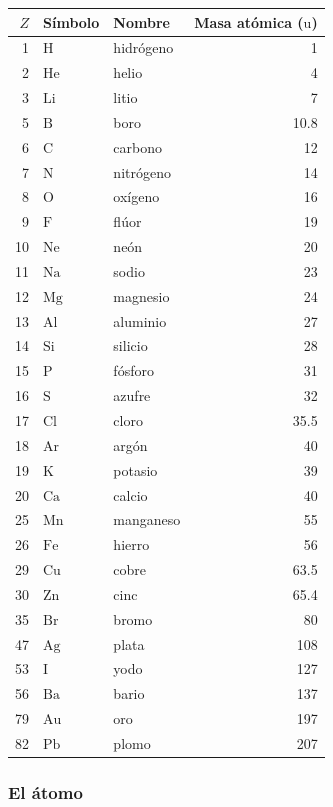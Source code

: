 \begin{center}
\begin{tabular}{rllr}
\hline
$Z$ & Símbolo & Nombre & Masa atómica ($\mathrm{u}$) \\
\hline
1  & $\mathrm{H}$  & hidrógeno & 1 \\
2  & $\mathrm{He}$ & helio & 4 \\
3  & $\mathrm{Li}$ & litio & 7 \\
5  & $\mathrm{B}$  & boro & 10.8 \\
6  & $\mathrm{C}$  & carbono & 12 \\
7  & $\mathrm{N}$  & nitrógeno & 14 \\
8  & $\mathrm{O}$  & oxígeno & 16 \\
9  & $\mathrm{F}$  & flúor & 19 \\
10 & $\mathrm{Ne}$ & neón & 20 \\
11 & $\mathrm{Na}$ & sodio & 23 \\
12 & $\mathrm{Mg}$ & magnesio & 24 \\
13 & $\mathrm{Al}$ & aluminio & 27 \\
14 & $\mathrm{Si}$ & silicio & 28 \\
15 & $\mathrm{P}$  & fósforo & 31 \\
16 & $\mathrm{S}$  & azufre & 32 \\
17 & $\mathrm{Cl}$ & cloro & 35.5 \\
18 & $\mathrm{Ar}$ & argón & 40 \\
19 & $\mathrm{K}$  & potasio & 39 \\
20 & $\mathrm{Ca}$ & calcio & 40 \\
25 & $\mathrm{Mn}$ & manganeso & 55 \\
26 & $\mathrm{Fe}$ & hierro & 56 \\
29 & $\mathrm{Cu}$ & cobre & 63.5 \\
30 & $\mathrm{Zn}$ & cinc & 65.4 \\
35 & $\mathrm{Br}$ & bromo & 80 \\
47 & $\mathrm{Ag}$ & plata & 108 \\
53 & $\mathrm{I}$  & yodo & 127 \\
56 & $\mathrm{Ba}$ & bario & 137 \\
79 & $\mathrm{Au}$ & oro & 197 \\
82 & $\mathrm{Pb}$ & plomo & 207 \\
\hline
\end{tabular}
\end{center}

\subsubsection*{El átomo}

